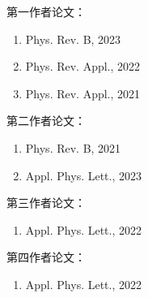 \documentclass[
    anonymous,              %
    type = doctor,
  ]{njuthesis}
\begin{document}

{
\noindent
第一作者论文：
\begin{enumerate}[label=(\arabic*)]  %
    \item Phys. Rev. B, 2023
    \item Phys. Rev. Appl., 2022
    \item Phys. Rev. Appl., 2021
\end{enumerate}

\noindent
第二作者论文：
\begin{enumerate}[label=(\arabic*)]  %
    \item Phys. Rev. B, 2021
    \item Appl. Phys. Lett., 2023
\end{enumerate}

\noindent
第三作者论文：
\begin{enumerate}[label=(\arabic*)]  %
    \item Appl. Phys. Lett., 2022
\end{enumerate}

\noindent
第四作者论文：
\begin{enumerate}[label=(\arabic*)]  %
    \item Appl. Phys. Lett., 2022
\end{enumerate}
}



\end{document}
